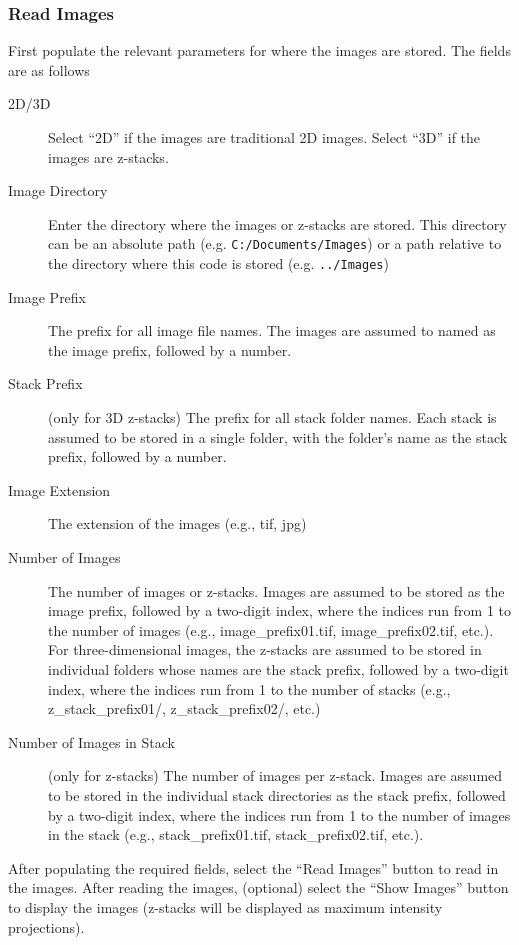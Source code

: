 \documentclass[12pt]{article}
\begin{document}
\subsubsection{Read Images}

First populate the relevant parameters for where the images are stored.
%
The fields are as follows
\begin{description}
%
\item[2D/3D] Select ``2D'' if the images are traditional 2D images. Select ``3D'' if the images are z-stacks.
%
\item[Image Directory] Enter the directory where the images or z-stacks are stored. This directory can be an absolute path (e.g. \texttt{C:/Documents/Images}) or a path relative to the directory where this code is stored (e.g. \texttt{../Images})
%
\item[Image Prefix] The prefix for all image file names. The images are assumed to named as the image prefix, followed by a number. 
%
\item[Stack Prefix] (only for 3D z-stacks) The prefix for all stack folder names. Each stack is assumed to be stored in a single folder, with the folder's name as the stack prefix, followed by a number. 
%
\item[Image Extension] The extension of the images (e.g., tif, jpg)
%
\item[Number of Images] The number of images or z-stacks. Images are assumed to be stored as the image prefix, followed by a two-digit index, where the indices run from 1 to the number of images (e.g., image\_prefix01.tif, image\_prefix02.tif, etc.). For three-dimensional images, the z-stacks are assumed to be stored in individual folders whose names are the stack prefix, followed by a two-digit index, where the indices run from 1 to the number of stacks (e.g., z\_stack\_prefix01/, z\_stack\_prefix02/, etc.)
%
\item[Number of Images in Stack] (only for z-stacks) The number of images per z-stack. Images are assumed to be stored in the individual stack directories as the stack prefix, followed by a two-digit index, where the indices run from 1 to the number of images in the stack (e.g., stack\_prefix01.tif, stack\_prefix02.tif, etc.). 
%
\end{description}

After populating the required fields, select the ``Read Images'' button to read in the images.
%
After reading the images, (optional) select the ``Show Images'' button to display the images (z-stacks will be displayed as maximum intensity projections).
\end{document}
